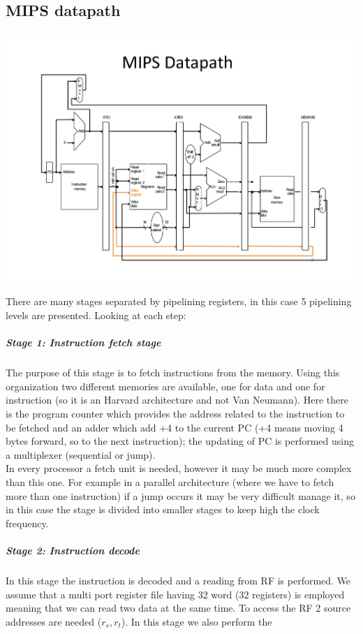 \subsection{MIPS datapath}
\begin{center}
  \includegraphics[width=1.0\linewidth]{img/img3/mips1}
\end{center}
There are many stages separated by pipelining registers, in this case 5
pipelining levels are presented. Looking at each step:
\subparagraph{Stage 1: Instruction fetch stage}
The purpose of this stage is to fetch instructions from the memory. Using this
organization two different memories are available, one for data and one for
instruction (so it is an Harvard architecture and not Van Neumann). Here there
is the program counter which provides the address related to the instruction to
be fetched and an adder which add +4 to the current PC (+4 means moving 4 bytes
forward, so to the next instruction); the updating of PC is performed using a
multiplexer (sequential or jump).\\
In every processor a fetch unit is needed, however it may be much more complex
than this one. For example in a parallel architecture (where we have to fetch
more than one instruction) if a jump occurs it may be very difficult manage it,
so in this case the stage is divided into smaller stages to keep high the clock
frequency.
\subparagraph{Stage 2: Instruction decode}
In this stage the instruction is decoded and a reading from RF is performed.
We assume that a multi port register file having 32 word (32 registers) is
employed meaning that we can read two data at the same time. To access the RF
2 source addresses are needed ($r_s, r_t$). In this stage we also perform the
